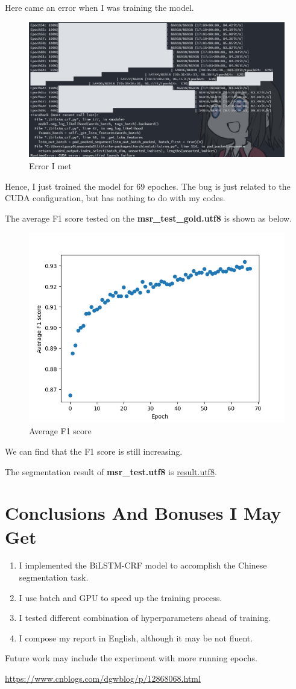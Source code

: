 \documentclass[a4paper, 11pt]{article}
\begin{document}
Here came an error when I was training the model.
\begin{figure}[H]
      \centering
      \includegraphics[width = 0.8 \textwidth]{error.png}
      \caption{Error I met}
\end{figure}
Hence, I just trained the model for 69 epoches. The bug is just related to the CUDA configuration, but has nothing to do with my codes.
\cite{ref1}

The average F1 score tested on the \textbf{msr\_test\_gold.utf8} is shown as below.
\begin{figure}[H]
      \centering
      \includegraphics[width = 0.8 \textwidth]{Figure_1.png}
      \caption{Average F1 score}
\end{figure}
We can find that the F1 score is still increasing.

The segmentation result of \textbf{msr\_test.utf8} is \href{result.utf8}{result.utf8}.

\section{Conclusions And Bonuses I May Get}
\begin{enumerate}
      \item I implemented the BiLSTM-CRF model to accomplish the Chinese segmentation task.
      \item I use batch and GPU to speed up the training process.
      \item I tested different combination of hyperparameters ahead of training.
      \item I compose my report in English, although it may be not fluent.
\end{enumerate}

Future work may include the experiment with more running epochs.

\begin{thebibliography}{99}
     \url{https://www.cnblogs.com/dgwblog/p/12868068.html}

\end{thebibliography}
\end{document}
